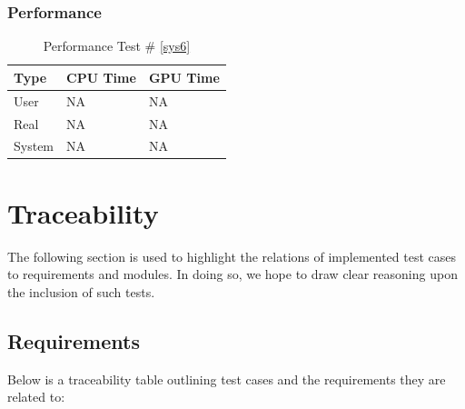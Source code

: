 \documentclass[12pt]{article}
\begin{document}
	\subsubsection{Performance}
		\begin{table}[!htbp]
		\centering
		\caption{Performance Test \# \ref{sys6}}\label{_acc}
		\begin{tabular}{lll}
		\toprule
		Type&CPU Time& GPU Time\\\midrule
		User&NA&NA\\
		Real&NA&NA\\
		System&NA&NA\\
		\end{tabular}
		\end{table}
\section{Traceability}
The following section is used to highlight the relations of implemented test cases to requirements and modules. In doing so, we hope to draw clear reasoning upon the inclusion of such tests. 
\subsection{Requirements}
Below is a traceability table outlining test cases and the requirements they are related to:\\
\end{document}
